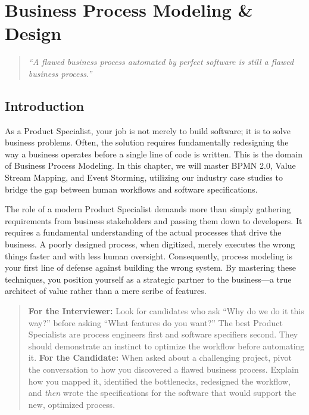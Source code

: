 \chapter{Business Process Modeling \&
Design}\label{business-process-modeling-design}

\begin{quote}
\emph{``A flawed business process automated by perfect software is still
a flawed business process.''}
\end{quote}

\section{Introduction}\label{introduction-1}

As a Product Specialist, your job is not merely to build software; it is
to solve business problems. Often, the solution requires fundamentally
redesigning the way a business operates before a single line of code is
written. This is the domain of Business Process Modeling. In this
chapter, we will master BPMN 2.0, Value Stream Mapping, and Event
Storming, utilizing our industry case studies to bridge the gap between
human workflows and software specifications.

The role of a modern Product Specialist demands more than simply
gathering requirements from business stakeholders and passing them down
to developers. It requires a fundamental understanding of the actual
processes that drive the business. A poorly designed process, when
digitized, merely executes the wrong things faster and with less human
oversight. Consequently, process modeling is your first line of defense
against building the wrong system. By mastering these techniques, you
position yourself as a strategic partner to the business---a true
architect of value rather than a mere scribe of features.

\begin{quote}
\textbf{For the Interviewer:} Look for candidates who ask ``Why do we do
it this way?'' before asking ``What features do you want?'' The best
Product Specialists are process engineers first and software specifiers
second. They should demonstrate an instinct to optimize the workflow
before automating it. \textbf{For the Candidate:} When asked about a
challenging project, pivot the conversation to how you discovered a
flawed business process. Explain how you mapped it, identified the
bottlenecks, redesigned the workflow, and \emph{then} wrote the
specifications for the software that would support the new, optimized
process.
\end{quote}

